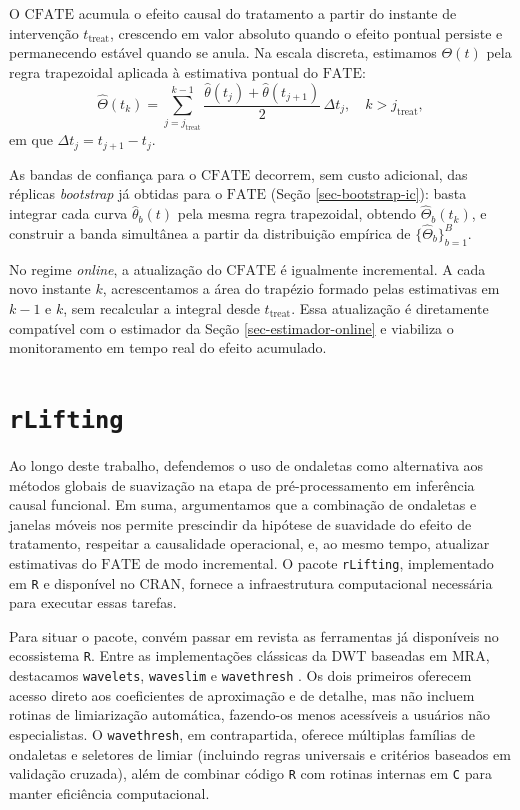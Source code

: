 O \(\mathrm{CFATE}\) acumula o efeito causal do tratamento a partir do instante de intervenção \(t_{\mathrm{treat}}\), crescendo em valor absoluto quando o efeito pontual persiste e permanecendo estável quando se anula.
Na escala discreta, estimamos \(\Theta(t)\) pela regra trapezoidal aplicada à estimativa pontual do \(\mathrm{FATE}\):
\[
    \hat{\Theta}(t_k) = \sum_{j=j_{\mathrm{treat}}}^{k-1} \frac{\hat{\theta}(t_j) + \hat{\theta}(t_{j+1})}{2}\,\Delta t_j, \quad k > j_{\mathrm{treat}},
\]
em que \(\Delta t_j = t_{j+1} - t_j\).

As bandas de confiança para o \(\mathrm{CFATE}\) decorrem, sem custo adicional, das réplicas \emph{bootstrap} já obtidas para o \(\mathrm{FATE}\) (Seção \ref{sec-bootstrap-ic}): basta integrar cada curva \(\hat{\theta}_b(t)\) pela mesma regra trapezoidal, obtendo \(\hat{\Theta}_b(t_k)\), e construir a banda simultânea a partir da distribuição empírica de \(\{\hat{\Theta}_b\}_{b=1}^{B}\).

No regime \emph{online}, a atualização do \(\mathrm{CFATE}\) é igualmente incremental. 
A cada novo instante \(k\), acrescentamos a área do trapézio formado pelas estimativas em \(k-1\) e \(k\), sem recalcular a integral desde \(t_{\mathrm{treat}}\). 
Essa atualização é diretamente compatível com o estimador da Seção \ref{sec-estimador-online} e viabiliza o monitoramento em tempo real do efeito acumulado.

\section{\texttt{rLifting}}\label{sec-rlifting}
Ao longo deste trabalho, defendemos o uso de ondaletas como alternativa aos métodos globais de suavização na etapa de pré-processamento em inferência causal funcional. 
Em suma, argumentamos que a combinação de ondaletas e janelas móveis nos permite prescindir da hipótese de suavidade do efeito de tratamento, respeitar a causalidade operacional, e, ao mesmo tempo, atualizar estimativas do \(\mathrm{FATE}\) de modo incremental. 
O pacote \texttt{rLifting}, implementado em \texttt{R} e disponível no CRAN, fornece a infraestrutura computacional necessária para executar essas tarefas.

Para situar o pacote, convém passar em revista as ferramentas já disponíveis no ecossistema \texttt{R}. 
Entre as implementações clássicas da DWT baseadas em MRA, destacamos \texttt{wavelets}, \texttt{waveslim} e \texttt{wavethresh} \cite{aldrich_wavelets_2005, brandon_whitcher_waveslim_2001, nason_wavethresh_1999}. 
Os dois primeiros oferecem acesso direto aos coeficientes de aproximação e de detalhe, mas não incluem rotinas de limiarização automática, fazendo-os menos acessíveis a usuários não especialistas. 
O \texttt{wavethresh}, em contrapartida, oferece múltiplas famílias de ondaletas e seletores de limiar (incluindo regras universais e critérios baseados em validação cruzada), além de combinar código \texttt{R} com rotinas internas em \texttt{C} para manter eficiência computacional.

